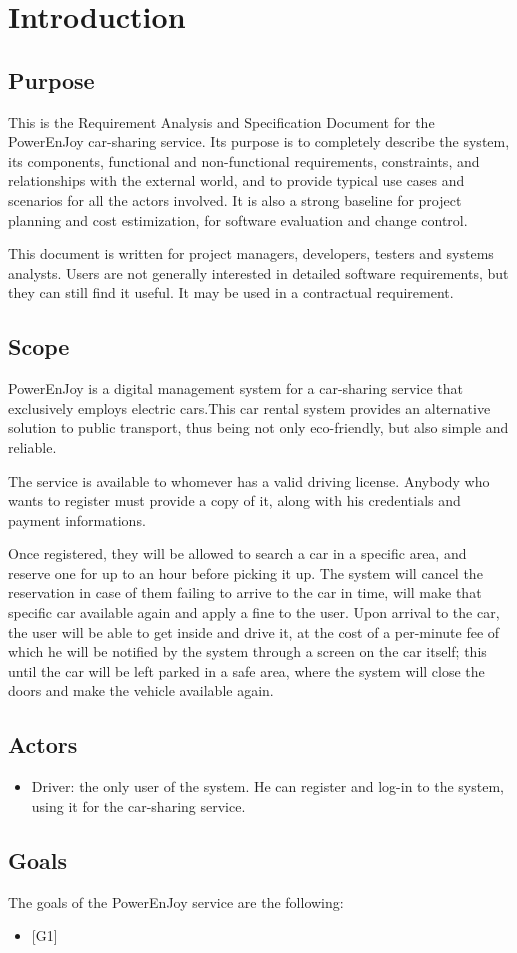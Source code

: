 \section{Introduction}
\subsection{Purpose}

This is the  Requirement Analysis and Specification Document for the PowerEnJoy car-sharing service.
Its purpose is to completely describe the system, its components, functional and non-functional requirements, constraints, and relationships with the external world, and to provide typical use cases and scenarios for all the actors involved. It is also a strong baseline for project planning and cost estimization, for software evaluation and change control.


This document is written for project managers, developers, testers and systems analysts. Users are not generally interested in detailed software requirements, but they can still find it useful. It may be used in a contractual requirement.

\subsection{Scope}

PowerEnJoy is a digital management system for a car-sharing service that exclusively employs electric cars.This car rental system provides an alternative solution to public transport, thus being not only eco-friendly, but also simple and reliable.

The service is available to whomever has a valid driving license. Anybody who wants to register must provide a copy of it, along with his credentials and payment informations.

Once registered, they will be allowed to search a car in a specific area, and reserve one for up to an hour before picking it up. The system will cancel the reservation in case of them failing to arrive to the car in time, will make that specific car available again and apply a fine to the user.
Upon arrival to the car, the user will be able to get inside and drive it, at the cost of a per-minute fee of which he will be notified by the system through a screen on the car itself; this until the car will be left parked in a safe area, where the system will close the doors and make the vehicle available again.

\subsection{Actors}
\begin{itemize}
	\item Driver: the only user of the system. He can register and log-in to the system, using it for the car-sharing service.  
\end{itemize}

\subsection{Goals}
The goals of the PowerEnJoy service are the following:
\begin{itemize}
	\item {[G1]}
\end{itemize}